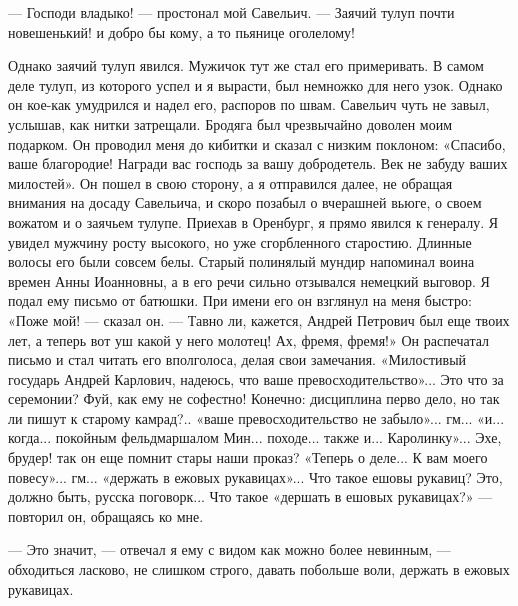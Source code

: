 — Господи владыко! — простонал мой Савельич. — Заячий тулуп почти новешенький! и добро бы кому, а то пьянице оголелому!

Однако заячий тулуп явился. Мужичок тут же стал его примеривать. В самом деле тулуп, из которого успел и я вырасти, был немножко для него узок. Однако он кое-как умудрился и надел его, распоров по швам. Савельич чуть не завыл, услышав, как нитки затрещали. Бродяга был чрезвычайно доволен моим подарком. Он проводил меня до кибитки и сказал с низким поклоном: «Спасибо, ваше благородие! Награди вас господь за вашу добродетель. Век не забуду ваших милостей». Он пошел в свою сторону, а я отправился далее, не обращая внимания на досаду Савельича, и скоро позабыл о вчерашней вьюге, о своем вожатом и о заячьем тулупе.
Приехав в Оренбург, я прямо явился к генералу. Я увидел мужчину росту высокого, но уже сгорбленного старостию. Длинные волосы его были совсем белы. Старый полинялый мундир напоминал воина времен Анны Иоанновны, а в его речи сильно отзывался немецкий выговор. Я подал ему письмо от батюшки. При имени его он взглянул на меня быстро: «Поже мой! — сказал он. — Тавно ли, кажется, Андрей Петрович был еще твоих лет, а теперь вот уш какой у него молотец! Ах, фремя, фремя!» Он распечатал письмо и стал читать его вполголоса, делая свои замечания. «Милостивый государь Андрей Карлович, надеюсь, что ваше превосходительство»... Это что за серемонии? Фуй, как ему не софестно! Конечно: дисциплина перво дело, но так ли пишут к старому камрад?.. «ваше превосходительство не забыло»... гм... «и... когда... покойным фельдмаршалом Мин... походе... также и... Каролинку»... Эхе, брудер! так он еще помнит стары наши проказ? «Теперь о деле... К вам моего повесу»... гм... «держать в ежовых рукавицах»... Что такое ешовы рукавиц? Это, должно быть, русска поговорк... Что такое «дершать в ешовых рукавицах?» — повторил он, обращаясь ко мне.

— Это значит, — отвечал я ему с видом как можно более невинным, — обходиться ласково, не слишком строго, давать побольше воли, держать в ежовых рукавицах.

